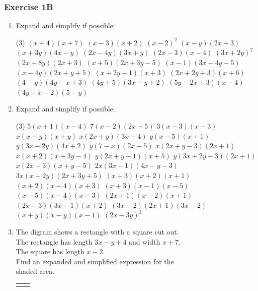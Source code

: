 \documentclass[fleqn]{article}
\newcommand{\exercise}{\subsubsection}
\begin{document}
\exercise{Exercise 1B}
\begin{enumerate}
	\item Expand and simplify if possible:
		\begin{tasks}(3) %
			\task $(x+4)(x+7)$			%
			\task $(x-3)(x+2)$			%
			\task $(x-2)^2$				%
			\task $(x-y)(2x+3)$			%
			\task $(x+3y)(4x-y)$			%
			\task $(2x-4y)(3x+y)$		%
			\task $(2x-3)(x-4)$			%
			\task $(3x+2y)^2$			%
			\task $(2x+8y)(2x+3)$		%
			\task $(x+5)(2x+3y-5)$		%
			\task $(x-1)(3x-4y-5)$		%
			\task $(x-4y)(2x+y+5)$		%
			\task $(x+2y-1)(x+3)$		%
			\task $(2x+2y+3)(x+6)$		%
			\task $(4-y)(4y-x+3)$		%
			\task $(4y+5)(3x-y+2)$		%
			\task $(5y-2x+3)(x-4)$		%
			\task $(4y-x-2)(5-y)$		%
		\end{tasks}
	\newpage
	\item Expand and simplify if possible:
		\begin{tasks}(3) %
			\task $5(x+1)(x-4)$			%
			\task $7(x-2)(2x+5)$			%
			\task $3(x-3)(x-3)$			%
			\task $x(x-y)(x+y)$			%
			\task $x(2x+y)(3x+4)$		%
			\task $y(x-5)(x+1)$			%
			\task $y(3x-2y)(4x+2)$		%
			\task $y(7-x)(2x-5)$			%
			\task $x(2x+y-3)(2x+1)$		%
			\task $x(x+2)(x+3y-4)$		%
			\task $y(2x+y-1)(x+5)$		%
			\task $y(3x+2y-3)(2x+1)$		%
			\task $x(2x+3)(x+y-5)$		%
			\task $2x(3x-1)(4x-y-3)$		%
			\task $3x(x-2y)(2x+3y+5)$	%
			\task $(x+3)(x+2)(x+1)$		%
			\task $(x+2)(x-4)(x+3)$		%
			\task $(x+3)(x-1)(x-5)$		%
			\task $(x-5)(x-4)(x-3)$		%
			\task $(2x+1)(x-2)(x+1)$		%
			\task $(2x+3)(3x-1)(x+2)$	%
			\task $(3x-2)(2x+1)(3x-2)$	%
			\task $(x+y)(x-y)(x-1)$		%
			\task $(2x-3y)^3$			%
		\end{tasks}
	\item The digram shows a rectangle with a square cut out.			\\ %
		  \indent The rectangle has length $3x-y+4$ and width $x+7$. 	\\
		  The square has length $x-2$.									\\
		  Find an expanded and simplified expression for the 			\\
		  shaded area.\vspace{-4mm}\\
		\begin{table}[!ht]
			\begin{tabularx}{\dimexpr\textwidth}{X@{\hskip10pt}p{3in}}
				{
					\hspace{8mm}
					\begin{tikzpicture}[x=0.75pt,y=0.75pt,yscale=-0.75,xscale=0.75]


\end{tikzpicture}}
\end{tabularx}
\end{table}
\end{enumerate}
\end{document}

